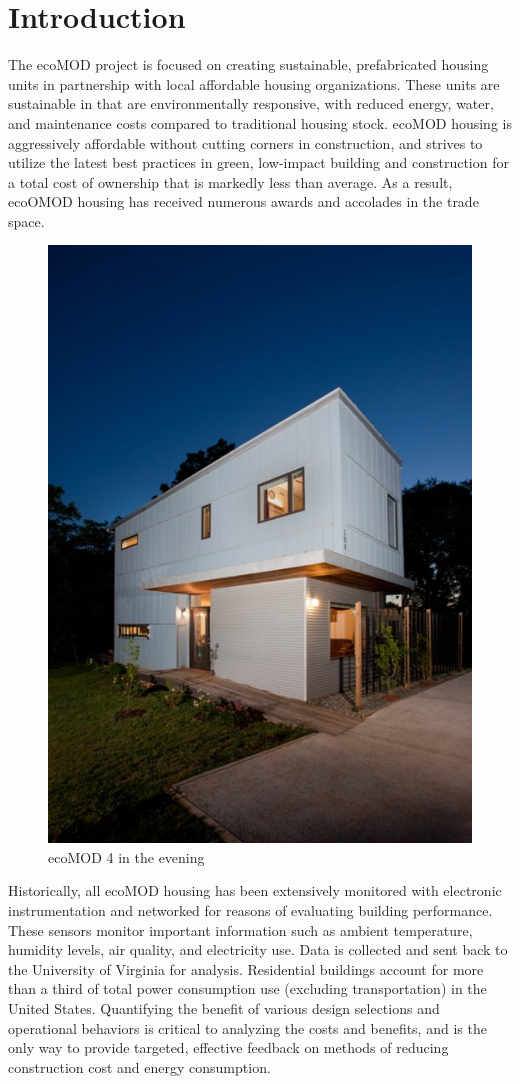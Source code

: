 \chapter{Introduction}

The ecoMOD project is focused on creating sustainable, prefabricated housing units in partnership with local affordable housing organizations. These units are sustainable in that are environmentally responsive, with reduced energy, water, and maintenance costs compared to traditional housing stock. ecoMOD housing is aggressively affordable without cutting corners in construction, and strives to utilize the latest best practices in green, low-impact building and construction for a total cost of ownership that is markedly less than average. As a result, ecoOMOD housing has received numerous awards and accolades in the trade space\cite{Lau2013}.

\begin{figure}
\centering
\includegraphics[width=0.3\linewidth]{./images/SFSmith_110602_8113-copy-500x705}
\caption{ecoMOD 4 in the evening\cite{Smith2011}}
\label{fig:SFSmith_110602_8113-copy-500x705}
\end{figure}

Historically, all ecoMOD housing has been extensively monitored with electronic instrumentation and networked for reasons of evaluating building performance. These sensors monitor important information such as ambient temperature, humidity levels, air quality, and electricity use. Data is collected and sent back to the University of Virginia for analysis. Residential buildings account for more than a third of total power consumption use (excluding transportation) in the United States\cite{EIA2015}. Quantifying the benefit of various design selections and operational behaviors is critical to analyzing the costs and benefits, and is the only way to provide targeted, effective feedback on methods of reducing construction cost and energy consumption.

